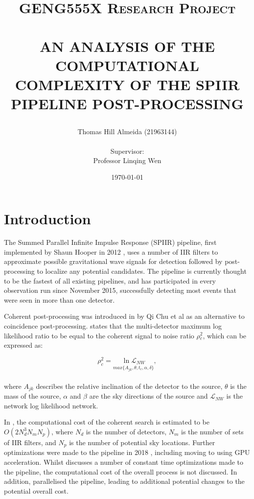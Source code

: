 \documentclass{article}
\title{\normalsize \textsc{GENG555X Research Project}
        \\ [1.5cm]
        \HRule{0.5pt} \\
        \LARGE \textbf{\uppercase{An analysis of the computational complexity of the SPIIR pipeline post-processing}}
        \HRule{2pt} \\ [0.5cm]
        \normalsize \date{\today} \vspace*{3\baselineskip}}
\author{Thomas Hill Almeida (21963144)\\
\\
Supervisor:\\
Professor Linqing Wen
}
\date{}
\begin{document}
\maketitle{}
\tableofcontents{}
\newpage{}

\section{Introduction} \label{sec:intro}

The Summed Parallel Infinite Impulse Response (SPIIR) pipeline, first implemented by Shaun Hooper in 2012 \cite{SPIIRCreate}, uses a number of IIR filters to approximate possible gravitational wave signals for detection followed by post-processing to localize any potential candidates.
The pipeline is currently thought to be the fastest of all existing pipelines, and has participated in every observation run since November 2015, successfully detecting most events that were seen in more than one detector.

Coherent post-processing was introduced in \cite{ChuThesis} by Qi Chu et al as an alternative to coincidence post-processing.
\cite{ChuThesis} states that the multi-detector maximum log likelihood ratio to be equal to the coherent signal to noise ratio \(\rho{}^2_c\), which can be expressed as:

\begin{equation}
    \rho^2_c = \underset{max\{A_{jk},\theta,t_{c},\alpha,\delta\}}{\ln \mathcal{L}_{NW}},
\end{equation}
\\
where \(A_{jk}\) describes the relative inclination of the detector to the source, \(\theta\) is the mass of the source, \(\alpha\) and \(\beta\) are the sky directions of the source and \(\mathcal{L}_{NW}\) is the network log likelihood network.

In \cite{ChuThesis}, the computational cost of the coherent search is estimated to be \(O(2N^3_dN_mN_p)\), where \(N_d\) is the number of detectors, \(N_m\) is the number of sets of IIR filters, and \(N_p\) is the number of potential sky locations.
Further optimizations were made to the pipeline in 2018 \cite{SPIIRGPU2018}, including moving to using GPU acceleration.
Whilst \cite{SPIIRGPU2018} discusses a number of constant time optimizations made to the pipeline, the computational cost of the overall process is not discussed.
In addition, \cite{SPIIRGPU2018} parallelised the pipeline, leading to additional potential changes to the potential overall cost.
\end{document}
